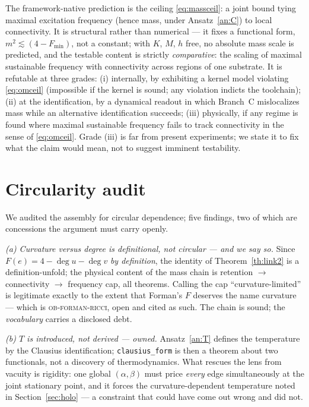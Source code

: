 \documentclass[10pt,twocolumn]{article}
\theoremstyle{definition}
\newcommand{\code}[1]{\texttt{#1}}
\begin{document}
The framework-native prediction is the ceiling \eqref{eq:massceil}: a joint bound
tying maximal excitation frequency (hence mass, under Ansatz~\ref{an:C}) to local
connectivity. It is structural rather than numerical --- it fixes a functional form,
$m^2 \lesssim (4-F_{\min})$, not a constant; with $K$, $M$, $h$ free, no absolute
mass scale is predicted, and the testable content is strictly \emph{comparative}:
the scaling of maximal sustainable frequency with connectivity across regions of one
substrate. It is refutable at three grades:
(i) internally, by exhibiting a kernel model violating \eqref{eq:omceil} (impossible
if the kernel is sound; any violation indicts the toolchain); (ii) at the
identification, by a dynamical readout in which Branch~C mislocalizes mass while an
alternative identification succeeds; (iii) physically, if any regime is found where
maximal sustainable frequency fails to track connectivity in the sense of
\eqref{eq:omceil}. Grade (iii) is far from present experiments; we state it to fix
what the claim would mean, not to suggest imminent testability.

\section{Circularity audit}\label{sec:circ}

We audited the assembly for circular dependence; five findings, two of which are
concessions the argument must carry openly.

\emph{(a) Curvature versus degree is definitional, not circular --- and we say so.}
Since $F(e)=4-\deg u-\deg v$ \emph{by definition}, the identity of
Theorem~\ref{th:link2} is a definition-unfold; the physical content of the mass chain
is retention $\to$ connectivity $\to$ frequency cap, all theorems. Calling the cap
``curvature-limited'' is legitimate exactly to the extent that Forman's $F$ deserves
the name curvature --- which is \textsc{ob-forman-ricci}, open and cited as such.
The chain is sound; the \emph{vocabulary} carries a disclosed debt.

\emph{(b) $T$ is introduced, not derived --- owned.} Ansatz~\ref{an:T} defines the
temperature by the Clausius identification; \code{clausius\_form} is then a theorem
about two functionals, not a discovery of thermodynamics. What rescues the lens from
vacuity is rigidity: one global $(\alpha,\beta)$ must price \emph{every} edge
simultaneously at the joint stationary point, and it forces the curvature-dependent
temperature noted in Section~\ref{sec:holo} --- a constraint that could have come out
wrong and did not.
\end{document}
